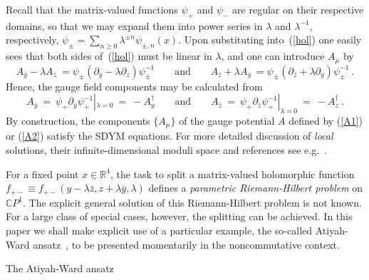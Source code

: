 \documentclass[a4paper,11pt]{article}
\makeatletter
\renewcommand{\section}{\@startsection{section}{1}{0pt}{\medskipamount}
{\medskipamount}{\large\bf}}
\numberwithin{equation}{section}
\def\l{\lambda}
\newcommand{\C}{\mathbb C}
\newcommand{\R}{\mathbb R}
\def\pa{\mbox{$\partial$}}
\def\+{\dagger}
\makeatother
\begin{document}
Recall that the matrix-valued functions $\psi_+$ and $\psi_-$ are regular 
on their respective domains, so that we may expand them
into power series in $\l$ and $\l^{-1}$, respectively,
$\psi_{\pm}=\sum_{n\ge 0}\l^{\pm n}\psi_{\pm,n}(x)$.
Upon substituting into~(\ref{hol}) one easily sees that both sides 
of~(\ref{hol}) must be linear in $\l$, and one can introduce $A_\mu$ by
\begin{equation}\label{A1}
A_{\bar y}-\l A_z\ = \psi_{\pm}(\pa_{\bar y}-\l\pa_z)\psi_{\pm}^{-1}
\qquad\textrm{and}\qquad
A_{\bar z}+\l A_y\ = \psi_{\pm}(\pa_{\bar z}+\l\pa_y)\psi_{\pm}^{-1} \ .
\end{equation}
Hence, the gauge field components may be calculated from
\begin{equation}\label{A2}
A_{\bar y}\ =\ \psi_{+}\pa_{\bar y}\psi_{+}^{-1}|_{\l =0}\ =\
-A_y^\+ \qquad\textrm{and}\qquad
A_{\bar z}\ =\ \psi_{+}\pa_{\bar z}\psi_{+}^{-1}|_{\l =0}\ =\
-A_z^\+ \ .
\end{equation}
By construction, the components $\{A_\mu\}$ of the gauge potential $A$ 
defined by (\ref{A1}) or (\ref{A2}) satisfy the SDYM equations.
{}For more detailed discussion of {\it local\/} solutions, their 
infinite-dimensional moduli space and references see 
e.g.~\cite{Crane:1987im,Popov:1999pc}.

{}For a fixed point $x\in\R^4$, the task to split a matrix-valued holomorphic 
function $f_{+-}\equiv f_{+-}(y{-}\l\bar z, z{+}\l\bar y, \l )$
defines a {\it parametric Riemann-Hilbert problem\/} on $\C P^1$. 
The explicit general solution of this Riemann-Hilbert problem is not known. 
{}For a large class of special cases, however, the splitting can be achieved. 
In this paper we shall make explicit use of a particular example,
the so-called Atiyah-Ward ansatz~\cite{Atiyah:1977pw}, to be presented
momentarily in the noncommutative context.


\section{The Atiyah-Ward ansatz}
\end{document}
